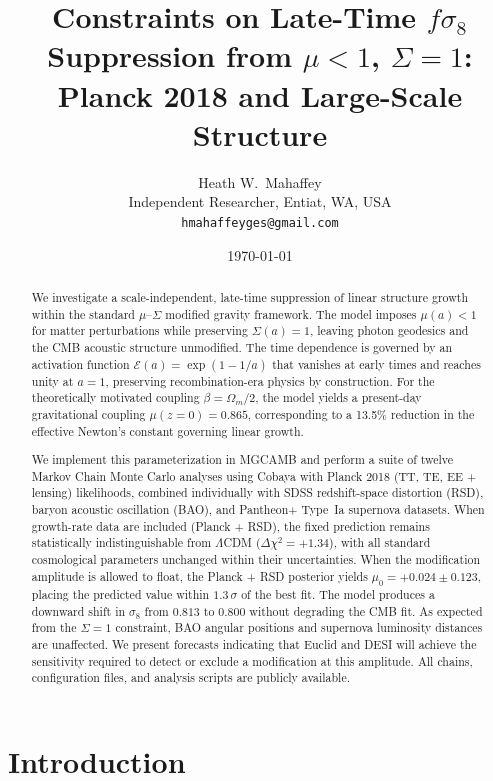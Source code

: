 \documentclass[11pt]{article}
\title{Constraints on Late-Time $f\sigma_8$ Suppression from $\mu < 1$, $\Sigma = 1$:\\
Planck 2018 and Large-Scale Structure}
\author{Heath W.\ Mahaffey\\
Independent Researcher, Entiat, WA, USA\\
\texttt{hmahaffeyges@gmail.com}}
\date{\today}
\begin{document}
\maketitle

\begin{abstract}
We investigate a scale-independent, late-time suppression of linear structure growth within the standard $\mu$--$\Sigma$ modified gravity framework.
The model imposes $\mu(a) < 1$ for matter perturbations while preserving $\Sigma(a) = 1$, leaving photon geodesics and the CMB acoustic structure unmodified.
The time dependence is governed by an activation function $\mathcal{E}(a) = \exp(1 - 1/a)$ that vanishes at early times and reaches unity at $a = 1$, preserving recombination-era physics by construction.
For the theoretically motivated coupling $\beta = \Omega_m / 2$, the model yields a present-day gravitational coupling $\mu(z{=}0) = 0.865$, corresponding to a 13.5\% reduction in the effective Newton's constant governing linear growth.

We implement this parameterization in MGCAMB and perform a suite of twelve Markov Chain Monte Carlo analyses using Cobaya with Planck 2018 (TT, TE, EE + lensing) likelihoods, combined individually with SDSS redshift-space distortion (RSD), baryon acoustic oscillation (BAO), and Pantheon+ Type~Ia supernova datasets.
When growth-rate data are included (Planck + RSD), the fixed prediction remains statistically indistinguishable from $\Lambda$CDM ($\Delta\chi^2 = +1.34$), with all standard cosmological parameters unchanged within their uncertainties.
When the modification amplitude is allowed to float, the Planck + RSD posterior yields $\mu_0 = +0.024 \pm 0.123$, placing the predicted value within $1.3\,\sigma$ of the best fit.
The model produces a downward shift in $\sigma_8$ from $0.813$ to $0.800$ without degrading the CMB fit.
As expected from the $\Sigma = 1$ constraint, BAO angular positions and supernova luminosity distances are unaffected.
We present forecasts indicating that Euclid and DESI will achieve the sensitivity required to detect or exclude a modification at this amplitude.
All chains, configuration files, and analysis scripts are publicly available.
\end{abstract}

\section{Introduction}
\label{sec:intro}
\end{document}
